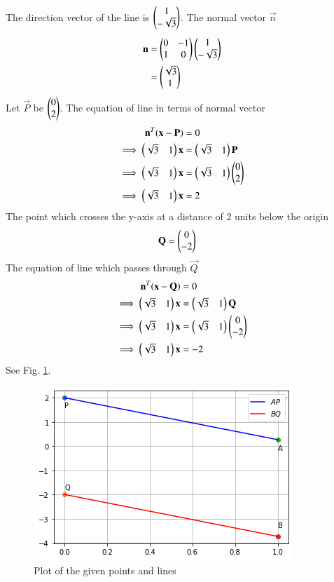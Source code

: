 The direction vector of the line is $\begin{pmatrix}1 \\ -\sqrt{3}\end{pmatrix}$. The normal vector $\vec{n}$
\begin{align}
    \mathbf{n} &= \begin{pmatrix}0 & -1 \\ 1 & 0\end{pmatrix}\begin{pmatrix}1 \\ -\sqrt{3}\end{pmatrix}\\
    &= \begin{pmatrix}\sqrt{3} \\ 1\end{pmatrix}
\end{align}
Let $\vec{P}$ be $\begin{pmatrix}0 \\ 2\end{pmatrix}$. The equation of line in terms of normal vector
\begin{align}
    \mathbf{n}^T(\mathbf{x} - \mathbf{P}) &= 0\\
    \implies \begin{pmatrix}\sqrt{3} & 1\end{pmatrix}\mathbf{x} &= \begin{pmatrix}\sqrt{3} & 1\end{pmatrix}\mathbf{P}\\
    \implies \begin{pmatrix}\sqrt{3} & 1\end{pmatrix}\mathbf{x} &= \begin{pmatrix}\sqrt{3} & 1\end{pmatrix}\begin{pmatrix}0 \\ 2\end{pmatrix}\\
    \implies \begin{pmatrix}\sqrt{3} & 1\end{pmatrix}\mathbf{x} &= 2
\end{align}
The point which crosses the y-axis at a distance of 2 units below the origin
\begin{align}
    \mathbf{Q} &= \begin{pmatrix}0 \\ -2\end{pmatrix}
\end{align}
The equation of line which passes through $\vec{Q}$
\begin{align}
    \mathbf{n}^T(\mathbf{x} - \mathbf{Q}) &= 0\\
    \implies \begin{pmatrix}\sqrt{3} & 1\end{pmatrix}\mathbf{x} &= \begin{pmatrix}\sqrt{3} & 1\end{pmatrix}\mathbf{Q}\\
    \implies \begin{pmatrix}\sqrt{3} & 1\end{pmatrix}\mathbf{x} &= \begin{pmatrix}\sqrt{3} & 1\end{pmatrix}\begin{pmatrix}0 \\ -2\end{pmatrix}\\
    \implies \begin{pmatrix}\sqrt{3} & 1\end{pmatrix}\mathbf{x} &= -2
\end{align}
    See Fig. \ref{aug/2/20/fig:plot}.
\begin{figure}[htp]
    \centering
    \includegraphics[width=\columnwidth]{solutions/aug/2/20/Figures/Fig1.png}
    \caption{Plot of the given points and lines}
    \label{aug/2/20/fig:plot}
\end{figure}

